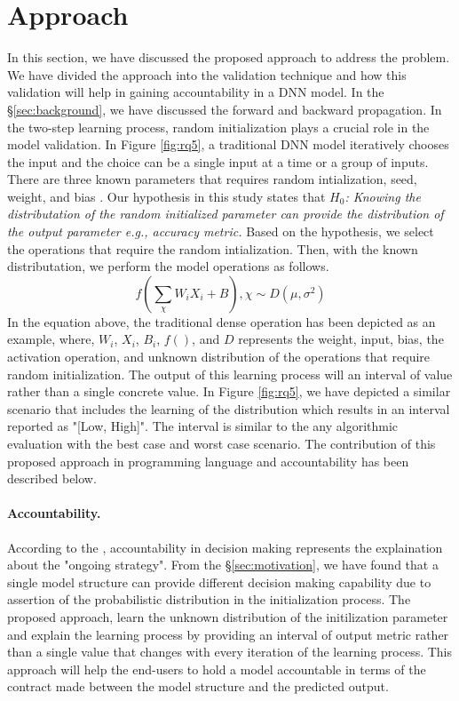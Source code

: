 \section{Approach}
\label{sec:approach}
In this section, we have discussed the proposed approach to address the problem. We have divided the approach into the validation technique and how this validation will help in gaining accountability in a DNN model. In the \S\ref{sec:background}, we have discussed the forward and backward propagation. In the two-step learning process, random initialization plays a crucial role in the model validation. In Figure \ref{fig:rq5}, a traditional DNN model iteratively chooses the input and the choice can be a single input at a time or a group of inputs. There are three known parameters that requires random intialization, seed, weight, and bias \cite{sutskever2013importance}. Our hypothesis in this study states that \emph{$H_0$: Knowing the distributation of the random initialized parameter can provide the distribution of the output parameter e.g., accuracy metric.} Based on the hypothesis, we select the operations that require the random intialization. Then, with the known distributation, we perform the model operations as follows.
\begin{equation}
f(\sum_{\chi}{W_iX_i+B}), \chi\sim D(\mu, \sigma^2)
\end{equation}
In the equation above, the traditional dense operation has been depicted as an example, where, $W_i$, $X_i$, $B_i$, $f()$, and $D$ represents the weight, input, bias, the activation operation, and unknown distribution of the operations that require random initialization. The output of this learning process will an interval of value rather than a single concrete value. In Figure \ref{fig:rq5}, we have depicted a similar scenario that includes the learning of the distribution which results in an interval reported as "[Low, High]". The interval is similar to the any algorithmic evaluation with the best case and worst case scenario. 
The contribution of this proposed approach in programming language and accountability has been described below.
\paragraph{Accountability.} According to the \cite{veale2018fairness}, accountability in decision making represents the explaination about the "ongoing strategy". From the \S\ref{sec:motivation}, we have found that a single model structure can provide different decision making capability due to assertion of the probabilistic distribution in the initialization process. The proposed approach, learn the unknown distribution of the initilization parameter and explain the learning process by providing an interval of output metric rather than a single value that changes with every iteration of the learning process. This approach will help the end-users to hold a model accountable in terms of the contract made between the model structure and the predicted output.